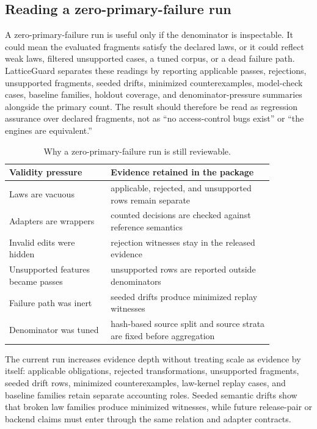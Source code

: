\documentclass[10pt,conference]{IEEEtran}
\begin{document}
\subsection{Reading a zero-primary-failure run}
A zero-primary-failure run is useful only if the denominator is inspectable.  It could mean the evaluated fragments satisfy the declared laws, or it could reflect weak laws, filtered unsupported cases, a tuned corpus, or a dead failure path.  LatticeGuard separates these readings by reporting applicable passes, rejections, unsupported fragments, seeded drifts, minimized counterexamples, model-check cases, baseline families, holdout coverage, and denominator-pressure summaries alongside the primary count.  The result should therefore be read as regression assurance over declared fragments, not as ``no access-control bugs exist'' or ``the engines are equivalent.''

\begin{table}[t]
\centering
\caption{Why a zero-primary-failure run is still reviewable.}
\label{tab:zerofailure}
\begin{tabular}{p{0.33\linewidth}p{0.53\linewidth}}
\toprule
Validity pressure & Evidence retained in the package \\
\midrule
Laws are vacuous & applicable, rejected, and unsupported rows remain separate \\
Adapters are wrappers & counted decisions are checked against reference semantics \\
Invalid edits were hidden & rejection witnesses stay in the released evidence \\
Unsupported features became passes & unsupported rows are reported outside denominators \\
Failure path was inert & seeded drifts produce minimized replay witnesses \\
Denominator was tuned & hash-based source split and source strata are fixed before aggregation \\
\bottomrule
\end{tabular}
\end{table}

The current run increases evidence depth without treating scale as evidence by itself: \LGPrimaryObligations{} applicable obligations, \LGRejected{} rejected transformations, \LGUnsupported{} unsupported fragments, \LGSeededRows{} seeded drift rows, \LGCounterexamples{} minimized counterexamples, \LGMechanizedKernelCases{} law-kernel replay cases, and \LGBaselineFamilies{} baseline families retain separate accounting roles.  Seeded semantic drifts show that broken law families produce minimized witnesses, while future release-pair or backend claims must enter through the same relation and adapter contracts.
\end{document}
